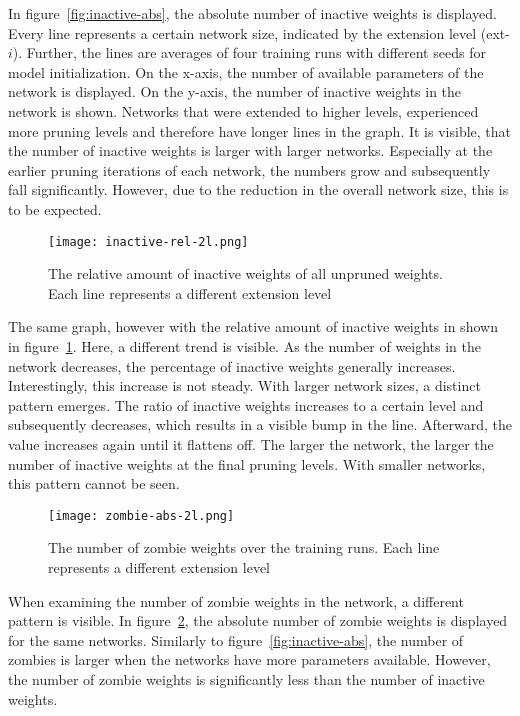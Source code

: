 In figure~\ref{fig:inactive-abs}, the absolute number of inactive weights is displayed.
Every line represents a certain network size, indicated by the extension level (ext-$i$).
Further, the lines are averages of four training runs with different seeds for model initialization.
On the x-axis, the number of available parameters of the network is displayed.
On the y-axis, the number of inactive weights in the network is shown.
Networks that were extended to higher levels, experienced more pruning levels and therefore have longer lines in the graph.
It is visible, that the number of inactive weights is larger with larger networks.
Especially at the earlier pruning iterations of each network, the numbers grow and subsequently fall significantly.
However, due to the reduction in the overall network size, this is to be expected.

\begin{figure}[ht]
    \centering
    \texttt{[image: inactive-rel-2l.png]}
    \caption{
        The relative amount of inactive weights of all unpruned weights. Each line represents a different extension level
    }\label{fig:inactive-rel}
\end{figure}
The same graph, however with the relative amount of inactive weights in shown in figure~\ref{fig:inactive-rel}.
Here, a different trend is visible.
As the number of weights in the network decreases, the percentage of inactive weights generally increases.
Interestingly, this increase is not steady.
With larger network sizes, a distinct pattern emerges.
The ratio of inactive weights increases to a certain level and subsequently decreases, which results in a visible bump in the line.
Afterward, the value increases again until it flattens off.
The larger the network, the larger the number of inactive weights at the final pruning levels.
With smaller networks, this pattern cannot be seen.

\begin{figure}[ht]
    \centering
    \texttt{[image: zombie-abs-2l.png]}
    \caption{
        The number of zombie weights over the training runs. Each line represents a different extension level
    }\label{fig:zombie-abs}
\end{figure}
When examining the number of zombie weights in the network, a different pattern is visible.
In figure~\ref{fig:zombie-abs}, the absolute number of zombie weights is displayed for the same networks.
Similarly to figure~\ref{fig:inactive-abs}, the number of zombies is larger when the networks have more parameters available.
However, the number of zombie weights is significantly less than the number of inactive weights.

